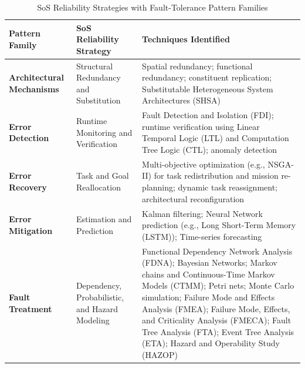 \begin{table}[htp]
\small
\caption{SoS Reliability Strategies with \citet{hanmer2013patterns} Fault-Tolerance Pattern Families}
\label{tab:sos-reliability-techniques}
\centering
\renewcommand{\arraystretch}{1.25}
\begin{tabular}{p{3.5cm} p{3.5cm} p{7.5cm}}
\toprule
\textbf{Pattern Family} & \textbf{SoS Reliability Strategy} & \textbf{Techniques Identified \cite{ferreira2021reliability, uday2015designing, abdelmoumen2026comprehensive}} \\
\midrule

\textbf{Architectural Mechanisms} 
& Structural Redundancy and Substitution 
& Spatial redundancy; functional redundancy; constituent replication; Substitutable Heterogeneous System Architectures (SHSA) \\


\midrule

\textbf{Error Detection} 
& Runtime Monitoring and Verification 
& Fault Detection and Isolation (FDI); runtime verification using Linear Temporal Logic (LTL) and Computation Tree Logic (CTL); anomaly detection \\

\midrule

\textbf{Error Recovery} 
& Task and Goal Reallocation 
& Multi-objective optimization (e.g., NSGA-II) for task redistribution and mission re-planning; dynamic task reassignment; architectural reconfiguration \\


\midrule

\textbf{Error Mitigation} 
& Estimation and Prediction 
& Kalman filtering; Neural Network  prediction (e.g., Long Short-Term Memory (LSTM)); Time-series forecasting\\

\midrule

\textbf{Fault Treatment} 
& Dependency, Probabilistic, and Hazard Modeling 
& Functional Dependency Network Analysis (FDNA); Bayesian Networks; Markov chains and Continuous-Time Markov Models (CTMM); Petri nets; Monte Carlo simulation; 
\newline
Failure Mode and Effects Analysis (FMEA); Failure Mode, Effects, and Criticality Analysis (FMECA); Fault Tree Analysis (FTA); Event Tree Analysis (ETA); Hazard and Operability Study (HAZOP) \\

\bottomrule
\end{tabular}
\end{table}
